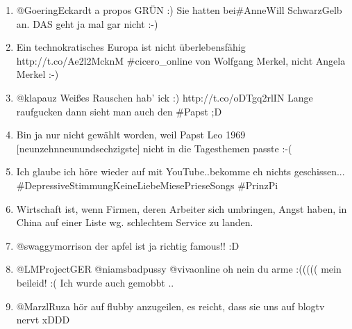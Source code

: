 \documentclass[12pt,fleqn]{scrreprt}
\begin{document}
\begin{enumerate}[I)]
\begin{enumerate}
  \item @GoeringEckardt a propos GR\"UN :) Sie hatten bei\#AnneWill
    SchwarzGelb an. DAS geht ja mal gar nicht :-)

  \item Ein technokratisches Europa ist nicht \"uberlebensf\"ahig
    http://t.co/Ae2l2McknM \#cicero\_online von Wolfgang Merkel, nicht
    Angela Merkel :-)

  \item @klapauz Wei\ss{}es Rauschen hab' ick :)
    http://t.co/oDTgq2rlIN Lange raufgucken dann sieht man auch den
    \#Papst ;D

  \item Bin ja nur nicht gew\"ahlt worden, weil Papst Leo 1969
    [neunzehnneunundsechzigste] nicht in die Tagesthemen passte :-(

  \item Ich glaube ich h\"ore wieder auf mit YouTube..bekomme eh
    nichts geschissen...\\\#DepressiveStimmungKeineLiebeMiesePrieseSongs
    \#PrinzPi

  \item Wirtschaft ist, wenn Firmen, deren Arbeiter sich umbringen,
    Angst haben, in China auf einer Liste wg. schlechtem Service zu
    landen.

  \item @swaggymorrison der apfel ist ja richtig famous!! :D

  \item @LMProjectGER @niamsbadpussy @vivaonline oh nein du arme
    :((((( mein beileid! :( Ich wurde auch gemobbt ..

  \item @MarzlRuza h\"or auf flubby anzugeilen, es reicht, dass sie
    uns auf blogtv nervt xDDD
  \end{enumerate}
\end{enumerate}
\end{document}
